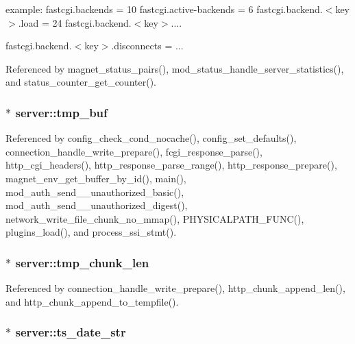 example\-: fastcgi.\-backends = 10 fastcgi.\-active-\/backends = 6 fastcgi.\-backend.$<$key$>$.load = 24 fastcgi.\-backend.$<$key$>$....

fastcgi.\-backend.$<$key$>$.disconnects = ... 

Referenced by magnet\-\_\-status\-\_\-pairs(), mod\-\_\-status\-\_\-handle\-\_\-server\-\_\-statistics(), and status\-\_\-counter\-\_\-get\-\_\-counter().

\hypertarget{structserver_aa23e0cfd582aff98760ee7b27ca0dcd2}{
\subsubsection[{tmp\-\_\-buf}]{$\ast$ server\-::tmp\-\_\-buf}}\label{structserver_aa23e0cfd582aff98760ee7b27ca0dcd2}


Referenced by config\-\_\-check\-\_\-cond\-\_\-nocache(), config\-\_\-set\-\_\-defaults(), connection\-\_\-handle\-\_\-write\-\_\-prepare(), fcgi\-\_\-response\-\_\-parse(), http\-\_\-cgi\-\_\-headers(), http\-\_\-response\-\_\-parse\-\_\-range(), http\-\_\-response\-\_\-prepare(), magnet\-\_\-env\-\_\-get\-\_\-buffer\-\_\-by\-\_\-id(), main(), mod\-\_\-auth\-\_\-send\-\_\-\_\-unauthorized\-\_\-basic(), mod\-\_\-auth\-\_\-send\-\_\-\_\-unauthorized\-\_\-digest(), network\-\_\-write\-\_\-file\-\_\-chunk\-\_\-no\-\_\-mmap(), P\-H\-Y\-S\-I\-C\-A\-L\-P\-A\-T\-H\-\_\-\-F\-U\-N\-C(), plugins\-\_\-load(), and process\-\_\-ssi\-\_\-stmt().

\hypertarget{structserver_adfdf3be2489e78973d3eb0b0b946c067}{
\subsubsection[{tmp\-\_\-chunk\-\_\-len}]{$\ast$ server\-::tmp\-\_\-chunk\-\_\-len}}\label{structserver_adfdf3be2489e78973d3eb0b0b946c067}


Referenced by connection\-\_\-handle\-\_\-write\-\_\-prepare(), http\-\_\-chunk\-\_\-append\-\_\-len(), and http\-\_\-chunk\-\_\-append\-\_\-to\-\_\-tempfile().

\hypertarget{structserver_a5395841d01eacd0b3732cf21141d11ea}{
\subsubsection[{ts\-\_\-date\-\_\-str}]{$\ast$ server\-::ts\-\_\-date\-\_\-str}}\label{structserver_a5395841d01eacd0b3732cf21141d11ea}


